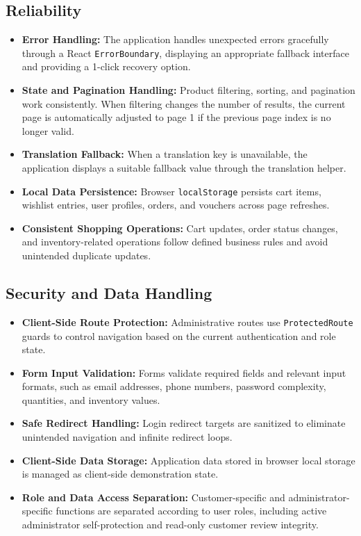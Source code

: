 \documentclass[12pt,a4paper,oneside]{report}
\begin{document}
\subsection{Reliability}
\begin{itemize}[leftmargin=1.2cm]
    \item \textbf{Error Handling:} The application handles unexpected errors gracefully through a React \texttt{ErrorBoundary}, displaying an appropriate fallback interface and providing a 1-click recovery option.
    \item \textbf{State and Pagination Handling:} Product filtering, sorting, and pagination work consistently. When filtering changes the number of results, the current page is automatically adjusted to page 1 if the previous page index is no longer valid.
    \item \textbf{Translation Fallback:} When a translation key is unavailable, the application displays a suitable fallback value through the translation helper.
    \item \textbf{Local Data Persistence:} Browser \texttt{localStorage} persists cart items, wishlist entries, user profiles, orders, and vouchers across page refreshes.
    \item \textbf{Consistent Shopping Operations:} Cart updates, order status changes, and inventory-related operations follow defined business rules and avoid unintended duplicate updates.
\end{itemize}

\subsection{Security and Data Handling}
\begin{itemize}[leftmargin=1.2cm]
    \item \textbf{Client-Side Route Protection:} Administrative routes use \texttt{ProtectedRoute} guards to control navigation based on the current authentication and role state.
    \item \textbf{Form Input Validation:} Forms validate required fields and relevant input formats, such as email addresses, phone numbers, password complexity, quantities, and inventory values.
    \item \textbf{Safe Redirect Handling:} Login redirect targets are sanitized to eliminate unintended navigation and infinite redirect loops.
    \item \textbf{Client-Side Data Storage:} Application data stored in browser local storage is managed as client-side demonstration state.
    \item \textbf{Role and Data Access Separation:} Customer-specific and administrator-specific functions are separated according to user roles, including active administrator self-protection and read-only customer review integrity.
\end{itemize}
\end{document}
